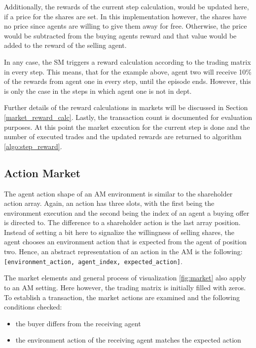 Additionally, the rewards of the current step calculation, would be updated here, if a price for the shares are set. In this implementation however, the shares have no price since agents are willing to give them away for free. Otherwise, the price would be subtracted from the buying agents reward and that value would be added to the reward of the selling agent. 

In any case, the SM triggers a reward calculation according to the trading matrix in every step. This means, that for the example above, agent two will receive 10\% of the rewards from agent one in every step, until the episode ends. However, this is only the case in the steps in which agent one is not in dept.

Further details of the reward calculations in markets will be discussed in Section \ref{market_reward_calc}. Lastly, the transaction count is documented for evaluation purposes. At this point the market execution for the current step is done and the number of executed trades and the updated rewards are returned to algorithm \ref{algo:step_reward}.

\subsection{Action Market}
The agent action shape of an AM environment is similar to the shareholder action array. Again, an action has three slots, with the first being the environment execution and the second being the index of an agent a buying offer is directed to. The difference to a shareholder action is the last array position. Instead of setting a bit here to signalize the willingness of selling shares, the agent chooses an environment action that is expected from the agent of position two. Hence, an abstract representation of an action in the AM is the following: \verb|[environment_action, agent_index, expected_action]|.

The market elements and general process of visualization \ref{fig:market} also apply to an AM setting. Here however, the trading matrix is initially filled with zeros. To establish a transaction, the market actions are examined and the following conditions checked:
\begin{itemize}
    \item the buyer differs from the receiving agent
    \item the environment action of the receiving agent matches the expected action
\end{itemize}

